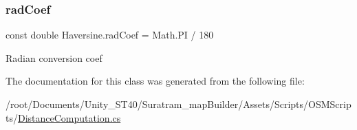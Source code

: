 \subsubsection{\texorpdfstring{rad\+Coef}{radCoef}}
{\footnotesize\ttfamily const double Haversine.\+rad\+Coef = Math.\+PI / 180\hspace{0.3cm}{\ttfamily [private]}}



Radian conversion coef



The documentation for this class was generated from the following file\+:\begin{DoxyCompactItemize}
\item 
/root/\+Documents/\+Unity\+\_\+\+S\+T40/\+Suratram\+\_\+map\+Builder/\+Assets/\+Scripts/\+O\+S\+M\+Scripts/\hyperlink{DistanceComputation_8cs}{Distance\+Computation.\+cs}\end{DoxyCompactItemize}
